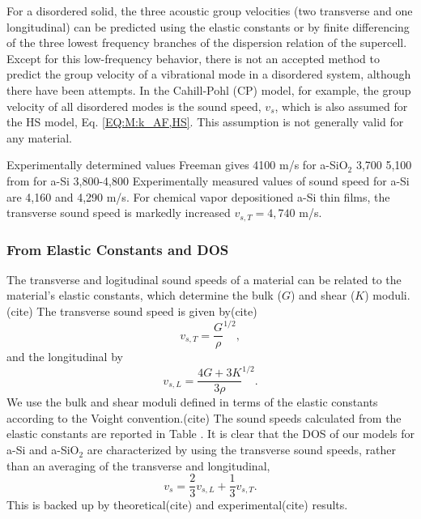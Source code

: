 \documentclass[aps,prb,twocolumn,superscriptaddress,footinbib,amsmath,amssymb,floatfix]{revtex4}
\begin{document}
For a disordered solid, the three acoustic group 
velocities (two transverse and one 
longitudinal) can be predicted using the elastic constants
\cite{gale_general_2003} 
or by finite differencing of the three lowest frequency branches 
of the dispersion relation of the supercell.
\cite{feldman_thermal_1993,feldman_numerical_1999,
donadio_atomistic_2009,he_thermal_2011,
he_heat_2011,hori_phonon_2013,larkin_predicting_2013} 
Except for this low-frequency behavior, there is not an 
accepted method to predict the group velocity of a 
vibrational mode in a disordered system, although there have been 
attempts.
\cite{cahill_lattice_1988,duda_reducing_2011,donadio_atomistic_2009,
he_heat_2011,he_thermal_2011} 
In the Cahill-Pohl (CP) model, for example, the group velocity of 
all disordered modes is the sound speed, $v_s$, which is also assumed  
for the HS model, Eq. \eqref{EQ:M:k_AF,HS}.
\cite{cahill_lattice_1988} This assumption is not generally valid  
for any material.\cite{feldman_numerical_1999,duda_reducing_2011,
donadio_atomistic_2009,he_heat_2011,he_thermal_2011,larkin_predicting_2013}

Experimentally determined values
Freeman gives 4100 m/s for a-SiO$_2$\cite{freeman_thermal_1986}
3,700 5,100 from \cite{pohl_low-temperature_2002}
for a-Si 3,800-4,800\cite{pohl_low-temperature_2002}
Experimentally measured values of sound speed for a-Si are 4,160
\cite{senn_physics_1979} and 
4,290 m/s\cite{vacher_attenuation_1980}.
\cite{feldman_elastic_1991} 
For chemical vapor depositioned a-Si thin films, the transverse 
sound speed is markedly increased $v_{s,T} = 4,740$ m/s.
\cite{liu_high_2009} 


\subsubsection{\label{S:Structure}From Elastic Constants and DOS}

The transverse and logitudinal sound speeds of a material can be related 
to the material's elastic constants, which determine the bulk ($G$) and 
shear ($K$) moduli.(cite) The transverse sound speed is given by(cite)  
\begin{equation}\label{EQ:vs_T_elas}
v_{s,T} = \frac{G}{\rho}^{1/2},
\end{equation}
and the longitudinal by
\begin{equation}\label{EQ:vs_L_elas}
v_{s,L} = \frac{4G + 3K}{3\rho}^{1/2}.
\end{equation}
We use the bulk and shear moduli defined in terms of the elastic 
constants according to the Voight convention.(cite) 
The sound speeds calculated from the 
elastic constants are reported in Table . It is clear that the DOS of 
our models for a-Si and a-SiO$_2$ are characterized by using the 
transverse sound speeds, rather than an averaging of the transverse 
and longitudinal, 
\begin{equation}\label{EQ:vs_avg}
v_{s} = \frac{2}{3}v_{s,L} + \frac{1}{3}v_{s,T}. 
\end{equation}
This is backed up by theoretical(cite) and experimental(cite) results. 
\end{document}
